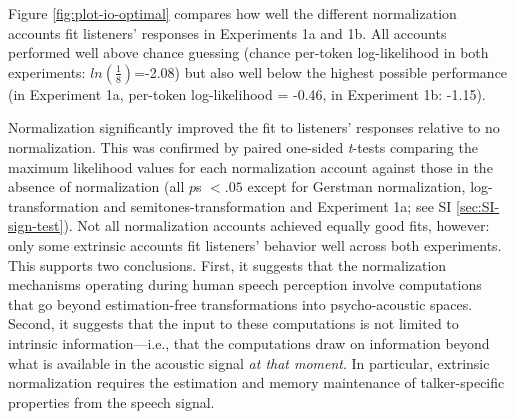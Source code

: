 \documentclass[preprint]{JASA}
\begin{document}
Figure \ref{fig:plot-io-optimal} compares how well the different normalization accounts fit listeners' responses in Experiments 1a and 1b. All accounts performed well above chance guessing (chance per-token log-likelihood in both experiments: \(ln(\frac{1}{8})\)=-2.08) but also well below the highest possible performance (in Experiment 1a, per-token log-likelihood = -0.46, in Experiment 1b: -1.15).

Normalization significantly improved the fit to listeners' responses relative to no normalization. This was confirmed by paired one-sided \emph{t}-tests comparing the maximum likelihood values for each normalization account against those in the absence of normalization (all \(p\)s \(< .05\) except for Gerstman normalization, log-transformation and semitones-transformation and Experiment 1a; see SI \ref{sec:SI-sign-test}). Not all normalization accounts achieved equally good fits, however: only some extrinsic accounts fit listeners' behavior well across both experiments. This supports two conclusions. First, it suggests that the normalization mechanisms operating during human speech perception involve computations that go beyond estimation-free transformations into psycho-acoustic spaces. Second, it suggests that the input to these computations is not limited to intrinsic information---i.e., that the computations draw on information beyond what is available in the acoustic signal \emph{at that moment}. In particular, extrinsic normalization requires the estimation and memory maintenance of talker-specific properties from the speech signal.
\end{document}
